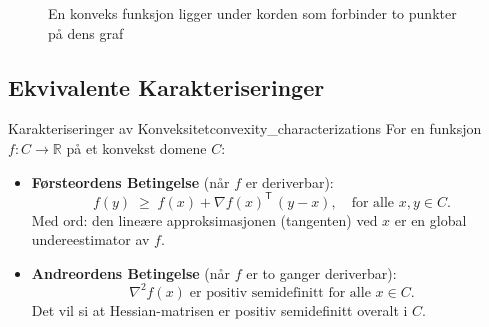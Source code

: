 \begin{figure}[htb]
  \centering
  \caption{En konveks funksjon ligger under korden som forbinder to punkter på dens graf}
  \label{fig:convex_function}
\end{figure}

\subsection{Ekvivalente Karakteriseringer}
\begin{theorem}{Karakteriseringer av Konveksitet}{convexity_characterizations}
  For en funksjon $f: C \to \mathbb{R}$ på et konvekst domene $C$:
  \begin{itemize}
    \item \textbf{Førsteordens Betingelse} (når $f$ er deriverbar):
    \[
    f(y)\;\ge\; f(x) + \nabla f(x)^\mathsf{T}\,(y - x), \quad \text{for alle }x, y \in C.
    \]
    Med ord: den lineære approksimasjonen (tangenten) ved $x$ er en global undereestimator av $f$.
    
    \item \textbf{Andreordens Betingelse} (når $f$ er to ganger deriverbar):
    \[
    \nabla^2 f(x)\; \text{er positiv semidefinitt for alle }x \in C.
    \]
    Det vil si at Hessian-matrisen er positiv semidefinitt overalt i $C$.
  \end{itemize}
\end{theorem}

